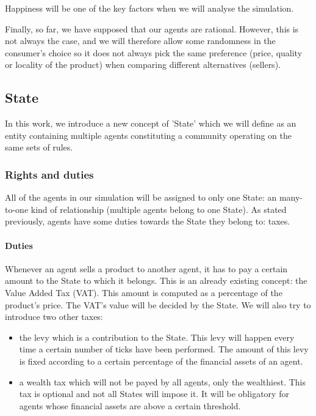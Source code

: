 \documentclass[20pt]{article}
\begin{document}
Happiness will be one of the key factors when we will analyse the simulation.

Finally, so far, we have supposed that our agents are rational. However, this is not always the case, and we will therefore allow some randomness in the consumer's choice so it does not always pick the same preference (price, quality or locality of the product) when comparing different alternatives (sellers).

\subsection{State}\label{section:state}
In this work, we introduce a new concept of 'State' which we will define as an entity containing multiple agents constituting a community operating on the same sets of rules.

\subsubsection{Rights and duties}
All of the agents in our simulation will be assigned to only one State: an many-to-one kind of relationship (multiple agents belong to one State). As stated previously, agents have some duties towards the State they belong to: taxes.

\paragraph{Duties}
Whenever an agent sells a product to another agent, it has to pay a certain amount to the State to which it belongs. This is an already existing concept: the Value Added Tax (VAT). This amount is computed as a percentage of the product's price. The VAT's value will be decided by the State. We will also try to introduce two other taxes:

\begin{itemize}
    \item the levy which is a contribution to the State. This levy will happen every time a certain number of ticks have been performed. The amount of this levy is fixed according to a certain percentage of the financial assets of an agent.
    \item a wealth tax which will not be payed by all agents, only the wealthiest. This tax is optional and not all States will impose it. It will be obligatory for agents whose financial assets are above a certain threshold.
\end{itemize}
\end{document}
